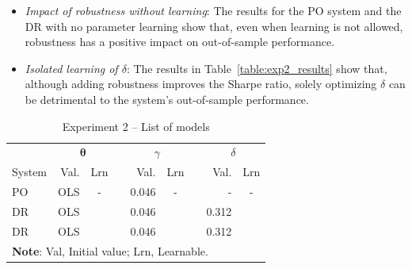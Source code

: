 \documentclass[10pt, twocolumn]{article}
\newcommand{\cmark}{\ding{51}}%
\newcommand{\xmark}{\ding{55}}%
\theoremstyle{plain}
\theoremstyle{definition}
\begin{document}
\begin{itemize}[itemsep=-0.15em, topsep=0pt, leftmargin=*]

\item \emph{Impact of robustness without learning}: The results for the 
  PO system and the DR with no parameter learning show that, even when 
  learning is not allowed, robustness has a positive impact on out-of-sample 
  performance.   
  
\item \emph{Isolated learning of \(\delta\)}: The results in 
  Table~\ref{table:exp2_results} show that, although adding robustness 
  improves the Sharpe ratio, solely optimizing \(\delta\) can be detrimental 
  to the system's out-of-sample performance.
  
\end{itemize}

\begin{table}[t]
\caption{Experiment 2 -- List of models}
\centering
\begin{tabular}{lrcr@{}rcr@{}rc}
\toprule
		& \multicolumn{2}{c}{\(\bm{\theta}\)} & & \multicolumn{2}{c}{\(\gamma\)} & & \multicolumn{2}{c}{\(\delta\)}\\[0.5ex] \cline{2-3} \cline{5-6} \cline{8-9}
\rule{0pt}{3ex}System 	& Val. 	& Lrn    && Val. & Lrn 	  && Val. & Lrn \\
\midrule
PO & OLS & -      && 0.046 & -      && -     & -      \\[0.5ex]
DR & OLS & \xmark && 0.046 & \xmark && 0.312 & \xmark \\[0.5ex]
DR & OLS & \xmark && 0.046 & \xmark && 0.312 & \cmark \\[0.25ex]
\bottomrule
\multicolumn{9}{p{0.9\linewidth}}{\small\rule{0pt}{3ex}\textbf{Note}: Val, Initial value; Lrn, Learnable.}\\
\end{tabular}
\label{table:exp2_models}
\end{table}
\end{document}
